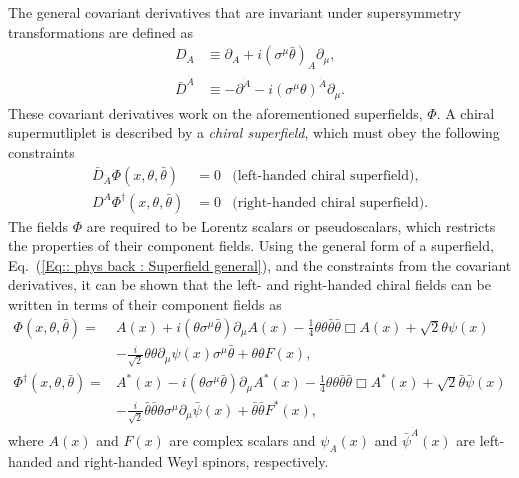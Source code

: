 \documentclass[twoside,english]{uiofysmaster}
\begin{document}
The general covariant derivatives that are invariant under supersymmetry transformations are defined as
\begin{align}\label{Eq:: phys back : susy covariant derivative D}
D_A & \equiv \partial_A + i (\sigma^{\mu} \bar{\theta})_A \partial_{\mu},\\
\bar{D}^{\dot{A}} & \equiv -\partial^{\dot{A}} - i (\sigma^{\mu} \theta)^{\dot{A}} \partial_{\mu}.\label{Eq:: phys back : susy covariant derivative Dbar}
\end{align}
These covariant derivatives work on the aforementioned superfields, $\Phi$. A chiral supermutliplet is described by a \textit{chiral superfield}, which must obey the following constraints
\begin{align}
\bar{D}_{\dot{A}} \Phi (x, \theta, \bar{\theta}) &= 0 &\text{(left-handed chiral superfield)},\\
D^A \Phi^{\dagger} (x, \theta, \bar{\theta}) &= 0 &\text{(right-handed chiral superfield)}.
\end{align}
The fields $\Phi$ are required to be Lorentz scalars or pseudoscalars, which restricts the properties of their component fields. Using the general form of a superfield, Eq.~(\ref{Eq:: phys back : Superfield general}), and the constraints from the covariant derivatives, it can be shown that the left- and right-handed chiral fields can be written in terms of their component fields as  \cite{batzing2017lecture}
\begin{align}
\Phi (x, \theta, \bar{\theta}) =& A(x) + i (\theta \sigma^{\mu} \bar{\theta}) \partial_{\mu} A(x) - \frac{1}{4} \theta \theta \bar{\theta} \bar{\theta} \Box A(x) + \sqrt{2} \theta \psi (x)\nonumber \\ 
& - \frac{i}{\sqrt{2}} \theta \theta \partial_{\mu} \psi (x) \sigma^{\mu} \bar{\theta} + \theta \theta F(x),\\
\Phi^{\dagger} (x, \theta, \bar{\theta}) =& A^*(x) - i (\theta \sigma^{\mu} \bar{\theta}) \partial_{\mu} A^*(x) - \frac{1}{4} \theta \theta \bar{\theta} \bar{\theta} \Box A^*(x) + \sqrt{2} \bar{\theta} \bar{\psi} (x)\nonumber \\
& - \frac{i}{\sqrt{2}} \bar{\theta} \bar{\theta} \theta \sigma^{\mu} \partial_{\mu} \bar{\psi} (x)  + \bar{\theta} \bar{\theta} F^*(x),
\end{align}
where $A(x)$ and $F(x)$ are complex scalars and $\psi_A(x)$ and $\bar{\psi}^{\dot{A}} (x)$ are left-handed and right-handed Weyl spinors, respectively. 
\end{document}
